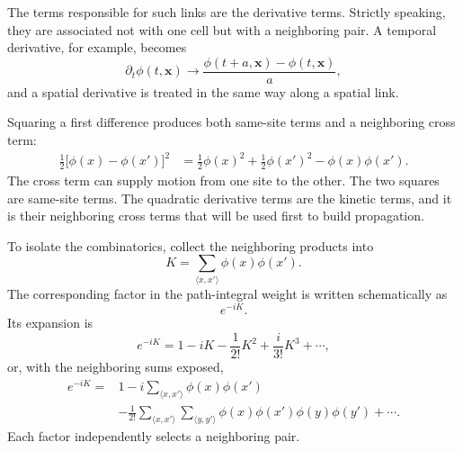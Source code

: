 The terms responsible for such links are the derivative terms. Strictly speaking, they are associated not with one cell but with a neighboring pair. A temporal derivative, for example, becomes
\begin{equation}
\partial_t\phi(t,\mathbf{x})
\longrightarrow
\frac{\phi(t+a,\mathbf{x})-\phi(t,\mathbf{x})}{a},
\end{equation}
and a spatial derivative is treated in the same way along a spatial link.

\begin{classroomqa}
\end{classroomqa}

Squaring a first difference produces both same-site terms and a neighboring cross term:
\begin{align}
\frac{1}{2}\bigl[\phi(x)-\phi(x')\bigr]^2
&=
\frac{1}{2}\phi(x)^2
+\frac{1}{2}\phi(x')^2
-\phi(x)\phi(x').
\end{align}
The cross term can supply motion from one site to the other. The two squares are same-site terms. The quadratic derivative terms are the kinetic terms, and it is their neighboring cross terms that will be used first to build propagation.

To isolate the combinatorics, collect the neighboring products into
\begin{equation}
K=\sum_{\langle x,x'\rangle}\phi(x)\phi(x').
\end{equation}
The corresponding factor in the path-integral weight is written schematically as
\begin{equation}
e^{-iK}.
\end{equation}
Its expansion is
\begin{equation}
e^{-iK}
=1-iK-\frac{1}{2!}K^2+\frac{i}{3!}K^3+\cdots,
\end{equation}
or, with the neighboring sums exposed,
\begin{align}
e^{-iK}
={}&1
-i\sum_{\langle x,x'\rangle}\phi(x)\phi(x')
\nonumber\\
&-\frac{1}{2!}
\sum_{\langle x,x'\rangle}
\sum_{\langle y,y'\rangle}
\phi(x)\phi(x')\phi(y)\phi(y')
+\cdots .
\end{align}
Each factor independently selects a neighboring pair.

